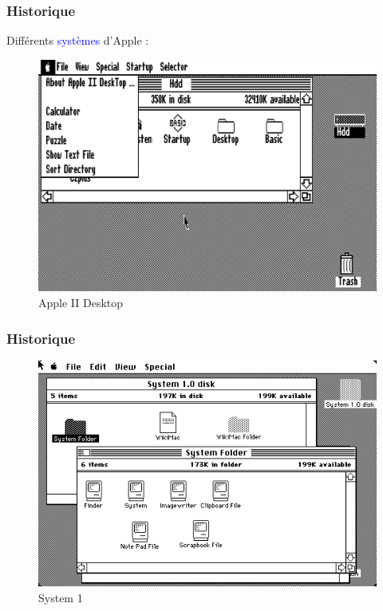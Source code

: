 \documentclass[aspectratio=169]{beamer}
\begin{document}
\begin{frame}
  \frametitle{Historique}
  Différents \textcolor{blue}{systèmes} d'Apple :

  \begin{figure}[!h]
    \center
    \includegraphics[scale=0.48]
    {textures/images/mac/historic/apple2.png}
    \caption{Apple II Desktop}
  \end{figure}
\end{frame}

\begin{frame}
  \frametitle{Historique}
  \begin{figure}[!h]
    \center
    \includegraphics[scale=0.59]
    {textures/images/mac/historic/system1.png}
    \caption{System 1}
  \end{figure}
\end{frame}
\end{document}
